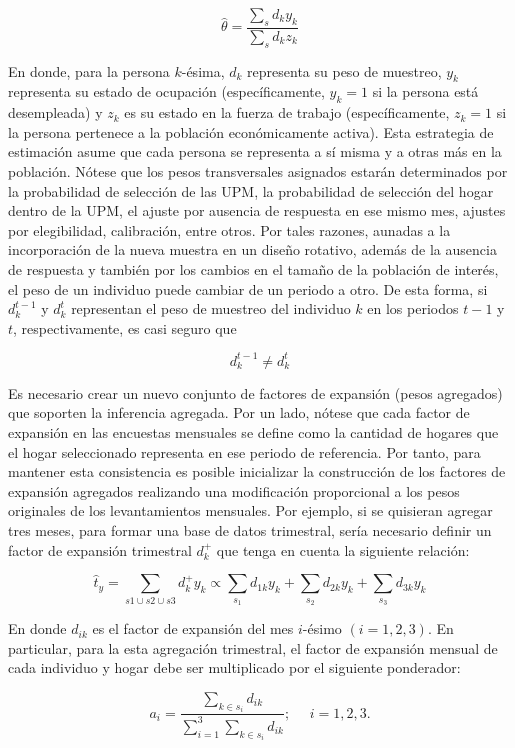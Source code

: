 \documentclass[
  12pt,
]{book}
\begin{document}
\[\hat\theta=\frac{\sum_s d_ky_k}{\sum_s d_kz_k}\]

En donde, para la persona \(k\)-ésima, \(d_k\) representa su peso de
muestreo, \(y_k\) representa su estado de ocupación (específicamente,
\(y_k=1\) si la persona está desempleada) y \(z_k\) es su estado en la
fuerza de trabajo (específicamente, \(z_k=1\) si la persona pertenece a la
población económicamente activa). Esta estrategia de estimación asume que cada persona
se representa a sí misma y a otras más en la población. Nótese que los
pesos transversales asignados estarán determinados por la probabilidad
de selección de las UPM, la probabilidad de selección del hogar dentro
de la UPM, el ajuste por ausencia de respuesta en ese mismo mes, ajustes
por elegibilidad, calibración, entre otros. Por tales razones, aunadas a
la incorporación de la nueva muestra en un diseño rotativo, además de la
ausencia de respuesta y también por los cambios en el tamaño de la
población de interés, el peso de un individuo puede cambiar de un
periodo a otro. De esta forma, si \(d_k^{t-1}\) y \(d_k^{t}\) representan el
peso de muestreo del individuo \(k\) en los periodos \(t-1\) y \(t\),
respectivamente, es casi seguro que

\[d_k^{t-1} \neq d_k^t\]

Es necesario crear un nuevo conjunto de factores de expansión (pesos
agregados) que soporten la inferencia agregada. Por un lado, nótese que cada factor de expansión en las encuestas mensuales se
define como la cantidad de hogares que el hogar seleccionado representa
en ese periodo de referencia. Por tanto, para mantener esta consistencia
es posible inicializar la construcción de los factores de expansión agregados realizando una modificación proporcional a los pesos originales de los levantamientos mensuales. Por ejemplo, si se quisieran agregar tres meses, para formar una base de datos trimestral, sería necesario definir un factor de expansión trimestral \(d_{k}^+\) que tenga en cuenta la siguiente relación:

\[
\hat{t}_y = \sum_{s1 \cup s2 \cup s3} d_{k}^+ y_k
\propto \sum_{s_1} d_{1k} y_k + \sum_{s_2} d_{2k} y_k + \sum_{s_3} d_{3k} y_k
\]

En donde \(d_{ik}\) es el factor de expansión del mes \(i\)-ésimo \((i = 1,2,3)\). En particular, para la esta agregación trimestral, el factor de expansión mensual de
cada individuo y hogar debe ser multiplicado por el siguiente
ponderador:

\[
a_i = \frac{\sum_{k\in s_i}d_{ik}}{\sum_{i=1}^{3}\sum_{k\in s_i}d_{ik}}; \ \ \ \ \ \ i= 1, 2 ,3.
\]
\end{document}
